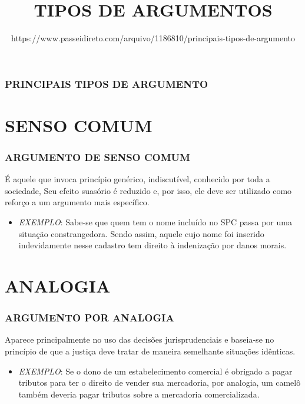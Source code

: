 \documentclass[aspectratio=1610]{beamer}
\title{TIPOS DE ARGUMENTOS}
\author[Passei Direito]{https://www.passeidireto.com/arquivo/1186810/principais-tipos-de-argumento}
\begin{document}
\maketitle
\tableofcontents 

\begin{frame}
  \frametitle{PRINCIPAIS TIPOS DE ARGUMENTO}
\end{frame}

\section {SENSO COMUM}
\begin{frame}
  \frametitle{ARGUMENTO DE SENSO COMUM   }
\begin{center}
É aquele que invoca princípio genérico, indiscutível, conhecido por toda a sociedade, Seu efeito suasório é reduzido e, por isso, ele deve ser utilizado como reforço a um argumento mais específico.
\end{center}

\begin{itemize}
  \item \textit{EXEMPLO}: Sabe-se que quem tem o nome incluído no SPC passa por uma situação constrangedora. Sendo assim, aquele cujo nome foi inserido indevidamente nesse cadastro tem direito à indenização por danos morais.
\end{itemize}
\end{frame}

\section {ANALOGIA}
\begin{frame}
  \frametitle{ARGUMENTO POR ANALOGIA  }
\begin{center}
  Aparece principalmente no uso das decisões jurisprudenciais e baseia-se no princípio de que a justiça deve tratar de maneira semelhante situações idênticas.
 \end{center}

\begin{itemize}
  \item \textit{EXEMPLO}: Se o dono de um estabelecimento comercial é obrigado a pagar tributos para ter o direito de vender sua mercadoria, por analogia, um camelô também deveria pagar tributos sobre a mercadoria comercializada.
\end{itemize}
\end{frame}
\end{document}

